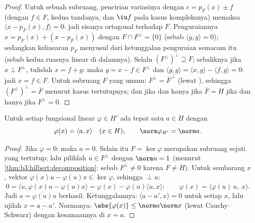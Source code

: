 \begin{proof}
Untuk sebuah subruang, pencirian variasinya dengan $c =
p_F(x) \pm f$ (dengan $f \in F$, kedua tandanya, dan $\iu f$ pada
kasus kompleksnya) memaksa $\langle x - p_F(x), f\rangle = 0$: jadi
sisanya ortogonal terhadap $F$. Penguraiannya $x = p_F(x) + (x
- p_F(x))$ dengan $F \cap F^\perp = \{0\}$ (sebab $\langle y, y
\rangle = 0$); sedangkan kelinearan $p_F$ menyusul dari ketunggalan
penguraian semacam itu (sebab kedua ruasnya linear di dalamnya). Selalu $(F^\perp)
^\perp \supseteq F$; sebaliknya jika $x \perp F^\perp$,
tulislah $x = f + g$: maka $g = x - f \in F^\perp$ dan $\langle g,
g\rangle = \langle x, g\rangle - \langle f, g\rangle = 0$: jadi $x
= f \in F$. Untuk subruang $F$ yang umum: $F^\perp = \bar
F^{\,\perp}$ (lewat  ), sehingga
$(F^\perp)^\perp = \bar F$ menurut kasus tertutupnya; dan  jika dan hanya jika
$\bar F = H$ jika dan hanya jika $F^\perp = 0$.
\end{proof}

\begin{theorem}\label{thm:b3:hilbert:riesz}
Untuk setiap fungsional linear  $\varphi \in H'$ ada
tepat satu $a \in H$ dengan
\[
\varphi(x) = \langle a, x\rangle \quad (x \in H),
\qquad \norm\varphi_{H'} = \norm a .
\]
\end{theorem}

\begin{proof}
Jika $\varphi = 0$: maka $a = 0$. Selain itu $F = \ker\varphi$ merupakan
subruang sejati yang tertutup; lalu pilihlah $u \in F^\perp$ dengan $\norm u = 1$
(menurut \cref{thm:b3:hilbert:decomposition}: sebab $F^\perp \neq 0$ karena
$F \neq H$). Untuk sembarang $x$, vektor $\varphi(x)u -
\varphi(u)x \in \ker\varphi$, sehingga $\perp u$:
\[
0 = \langle u, \varphi(x)u - \varphi(u)x\rangle
= \varphi(x) - \varphi(u)\langle u, x\rangle :
\qquad \varphi(x) = \langle
\overline{\varphi(u)}\,u,\ x\rangle .
\]
Jadi $a = \overline{\varphi(u)}u$ berhasil. Ketunggalannya: $\langle a
- a', x\rangle = 0$ untuk setiap $x$, lalu ujilah $x = a - a'$. Normanya:
$\abs{\varphi(x)} \leq \norm a\norm x$ (lewat Cauchy--Schwarz) dengan
kesamaannya di $x = a$.
\end{proof}

